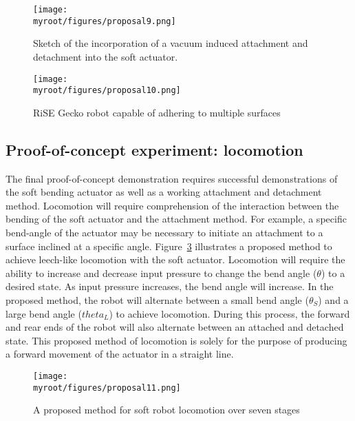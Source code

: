 \documentclass{IEEEtran}
\newcommand{\myroot}{../}
\begin{document}
\begin{figure}
\begin{center}
\texttt{[image: \\myroot/figures/proposal9.png]}
\end{center}
\caption{Sketch of the incorporation of a vacuum induced attachment and detachment into the soft actuator.}
\label{f9}
\end{figure}

\begin{figure}
\begin{center}
\texttt{[image: \\myroot/figures/proposal10.png]}
\end{center}
\caption{RiSE Gecko robot capable of adhering to multiple surfaces \cite{RiSEphoto}}
\label{f10}
\end{figure}

\subsection{Proof-of-concept experiment: locomotion}
The final proof-of-concept demonstration requires successful demonstrations of the soft bending actuator as well as a working attachment and detachment method.  Locomotion will require comprehension of the interaction between the bending of the soft actuator and the attachment method.  For example, a specific bend-angle of the actuator may be necessary to initiate an attachment to a surface inclined at a specific angle.  Figure~\ref{f11} illustrates a proposed method to achieve leech-like locomotion with the soft actuator.  Locomotion will require the ability to increase and decrease input pressure to change the bend angle ($\theta$) to a desired state.  As input pressure increases, the bend angle will increase.  In the proposed method, the robot will alternate between a small bend angle ($\theta_S$) and a large bend angle ($theta_L$) to achieve locomotion.  During this process, the forward and rear ends of the robot will also alternate between an attached and detached state.  This proposed method of locomotion is solely for the purpose of producing a forward movement of the actuator in a straight line.
\begin{figure}
\begin{center}
\texttt{[image: \\myroot/figures/proposal11.png]}
\end{center}
\caption{A proposed method for soft robot locomotion over seven stages}
\label{f11}
\end{figure}
\end{document}
